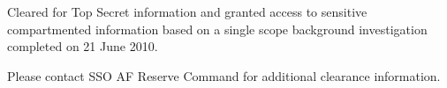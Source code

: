\documentclass[10pt]{article}
\renewcommand{\section}[1]{\pagebreak[3]%
    \vspace{1.3\baselineskip}%
    \phantomsection\addcontentsline{toc}{section}{#1}%
    \noindent\llap{\scshape\smash{\parbox[t]{\marginparwidth}{\hyphenpenalty=10000\raggedright #1}}}%
    \vspace{-\baselineskip}\par}
\begin{document}
Cleared for Top Secret information and granted access to sensitive compartmented information based on a single scope background investigation completed on 21 June 2010.

Please contact SSO AF Reserve Command for additional clearance information.

%

%
%
%


%
%
\end{document}
